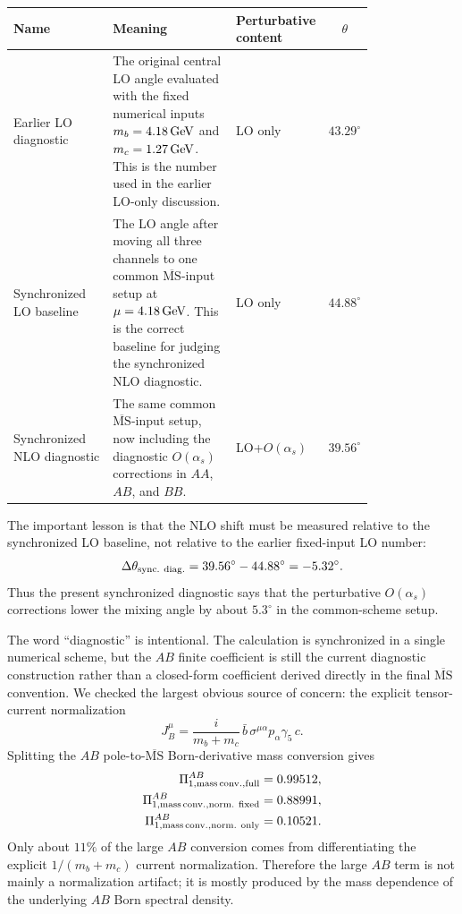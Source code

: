 \documentclass[11pt]{article}
\newcommand{\as}{\alpha_s}
\newcommand{\MSbar}{\overline{\mathrm{MS}}}
\begin{document}
\begin{center}
\small
\begin{tabular}{
>{\raggedright\arraybackslash}p{0.29\linewidth}
>{\raggedright\arraybackslash}p{0.35\linewidth}
>{\raggedright\arraybackslash}p{0.16\linewidth}
c}
\toprule
Name & Meaning & Perturbative content & \(\theta\)\\
\midrule
Earlier LO diagnostic &
The original central LO angle evaluated with the fixed numerical inputs
\(m_b=4.18\,{\rm GeV}\) and \(m_c=1.27\,{\rm GeV}\).  This is the number used
in the earlier LO-only discussion. &
LO only &
\(43.29^\circ\)\\
\addlinespace
Synchronized LO baseline &
The LO angle after moving all three channels to one common
\(\MSbar\)-input setup at \(\mu=4.18\,{\rm GeV}\).  This is the correct
baseline for judging the synchronized NLO diagnostic. &
LO only &
\(44.88^\circ\)\\
\addlinespace
Synchronized NLO diagnostic &
The same common \(\MSbar\)-input setup, now including the diagnostic
\(O(\as)\) corrections in \(AA\), \(AB\), and \(BB\). &
LO+\(O(\as)\) &
\(39.56^\circ\)\\
\bottomrule
\end{tabular}
\normalsize
\end{center}

The important lesson is that the NLO shift must be measured relative to the
synchronized LO baseline, not relative to the earlier fixed-input LO number:
\begin{equation}
 \Delta\theta_{\rm sync.\ diag.}
 =39.56^\circ-44.88^\circ
 =-5.32^\circ .
\end{equation}
Thus the present synchronized diagnostic says that the perturbative
\(O(\as)\) corrections lower the mixing angle by about \(5.3^\circ\) in the
common-scheme setup.

The word ``diagnostic'' is intentional.  The calculation is synchronized in a
single numerical scheme, but the \(AB\) finite coefficient is still the
current diagnostic construction rather than a closed-form coefficient derived
directly in the final \(\MSbar\) convention.  We checked the largest obvious
source of concern: the explicit tensor-current normalization
\begin{equation}
 J_B^\mu
 =
 \frac{i}{m_b+m_c}\,
 \bar b\,\sigma^{\mu\alpha}p_\alpha\gamma_5\,c .
\end{equation}
Splitting the \(AB\) pole-to-\(\MSbar\) Born-derivative mass conversion gives
\begin{align}
 \Pi^{AB}_{1,\rm mass\,conv.,full}&=0.99512,\\
 \Pi^{AB}_{1,\rm mass\,conv.,norm.\ fixed}&=0.88991,\\
 \Pi^{AB}_{1,\rm mass\,conv.,norm.\ only}&=0.10521.
\end{align}
Only about \(11\%\) of the large \(AB\) conversion comes from differentiating
the explicit \(1/(m_b+m_c)\) current normalization.  Therefore the large
\(AB\) term is not mainly a normalization artifact; it is mostly produced by
the mass dependence of the underlying \(AB\) Born spectral density.
\end{document}
